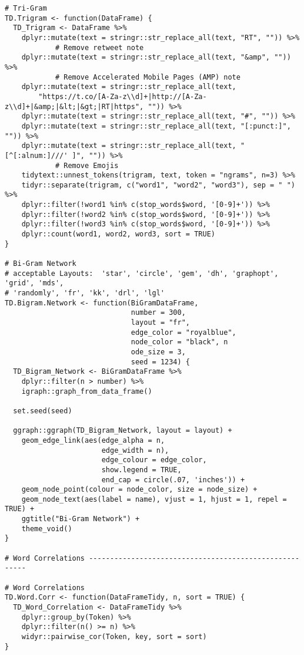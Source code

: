 \begin{lstlisting}
# Tri-Gram
TD.Trigram <- function(DataFrame) {
  TD_Trigram <- DataFrame %>% 
    dplyr::mutate(text = stringr::str_replace_all(text, "RT", "")) %>% 
    		# Remove retweet note
    dplyr::mutate(text = stringr::str_replace_all(text, "&amp", "")) %>% 
    		# Remove Accelerated Mobile Pages (AMP) note
    dplyr::mutate(text = stringr::str_replace_all(text, 
    	"https://t.co/[A-Za-z\\d]+|http://[A-Za-z\\d]+|&amp;|&lt;|&gt;|RT|https", "")) %>% 
    dplyr::mutate(text = stringr::str_replace_all(text, "#", "")) %>% 
    dplyr::mutate(text = stringr::str_replace_all(text, "[:punct:]", "")) %>% 
    dplyr::mutate(text = stringr::str_replace_all(text, "[^[:alnum:]///' ]", "")) %>%  
    		# Remove Emojis
    tidytext::unnest_tokens(trigram, text, token = "ngrams", n=3) %>%  
    tidyr::separate(trigram, c("word1", "word2", "word3"), sep = " ") %>% 
    dplyr::filter(!word1 %in% c(stop_words$word, '[0-9]+')) %>% 
    dplyr::filter(!word2 %in% c(stop_words$word, '[0-9]+')) %>%
    dplyr::filter(!word3 %in% c(stop_words$word, '[0-9]+')) %>%
    dplyr::count(word1, word2, word3, sort = TRUE)
}

# Bi-Gram Network
# acceptable Layouts:  'star', 'circle', 'gem', 'dh', 'graphopt', 'grid', 'mds', 
# 'randomly', 'fr', 'kk', 'drl', 'lgl'
TD.Bigram.Network <- function(BiGramDataFrame, 
                              number = 300, 
                              layout = "fr", 
                              edge_color = "royalblue", 
                              node_color = "black", n
                              ode_size = 3,  
                              seed = 1234) {
  TD_Bigram_Network <- BiGramDataFrame %>% 
    dplyr::filter(n > number) %>% 
    igraph::graph_from_data_frame()
  
  set.seed(seed)
  
  ggraph::ggraph(TD_Bigram_Network, layout = layout) +
    geom_edge_link(aes(edge_alpha = n, 
                       edge_width = n), 
                       edge_colour = edge_color, 
                       show.legend = TRUE, 
                       end_cap = circle(.07, 'inches')) +
    geom_node_point(colour = node_color, size = node_size) +
    geom_node_text(aes(label = name), vjust = 1, hjust = 1, repel = TRUE) +
    ggtitle("Bi-Gram Network") +
    theme_void()
}

# Word Correlations -------------------------------------------------------

# Word Correlations
TD.Word.Corr <- function(DataFrameTidy, n, sort = TRUE) {
  TD_Word_Correlation <- DataFrameTidy %>%
    dplyr::group_by(Token) %>%
    dplyr::filter(n() >= n) %>%
    widyr::pairwise_cor(Token, key, sort = sort)
}


\end{lstlisting}
